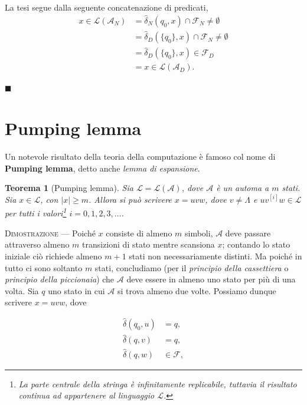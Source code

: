\documentclass[10pt]{\classname}
\theoremstyle{newlinethm}
\newtheorem{thm}{Teorema}[section]
\theoremstyle{theorem}
\theoremstyle{definition}
\theoremstyle{definition}
\theoremstyle{definition}
\theoremstyle{definition}
\begin{document}
La tesi segue dalla seguente concatenazione di predicati,
\begin{align*}
    x \in \mathcal L (\mathcal A_N) &= \hat\delta_N(q_0, x) \cap \mathcal F_N \neq \emptyset \\
                                    &= \hat\delta_D(\{q_0\}, x) \cap \mathcal F_N \neq \emptyset \\
                                    &= \hat\delta_D(\{q_0\}, x) \in \mathcal F_D \\
                                    &= x \in \mathcal L (\mathcal A_D).
\end{align*}

\begin{flushright}
$\blacksquare$
\end{flushright}


\section{Pumping lemma}

Un notevole risultato della teoria della computazione è famoso col nome di
\textbf{Pumping lemma}, detto anche \emph{lemma di espansione}.

\begin{thm}[Pumping lemma]
    Sia $\mathcal L = \mathcal L(\mathcal A)$, dove $\mathcal A$ è un automa a
    $m$ stati. Sia $x \in \mathcal L$, con $|x| \geq m$. Allora si può scrivere
    $x = uvw$, dove $v \neq \Lambda$ e $uv^{[i]}w \in \mathcal L$ per tutti i
    valori\footnote{La parte centrale della stringa è infinitamente replicabile, tuttavia il risultato continua ad appartenere al linguaggio $\mathcal L$.}  $i = 0,1,2,3,\dots$.
\end{thm}

\textsc{Dimostrazione} --- Poiché $x$ consiste di almeno $m$ simboli,
$\mathcal A$ deve passare attraverso almeno $m$ transizioni di stato mentre
scansiona $x$; contando lo stato iniziale ciò richiede almeno $m + 1$ stati non
necessariamente distinti. Ma poiché in tutto ci sono soltanto $m$ stati,
concludiamo (per il \emph{principio della cassettiera} o \emph{principio della piccionaia})
che $\mathcal A$ deve essere in almeno uno stato per più di una volta. Sia $q$ uno
stato in cui $\mathcal A$ si trova almeno due volte. Possiamo dunque scrivere
$x = uvw$, dove 

\begin{align}
    \hat{\delta} (q_0, u) &=   q, \\
        \hat{\delta} (q, v) &=   q, \\
        \hat{\delta} (q, w)  &\in   \mathcal F,
\end{align}
\end{document}
